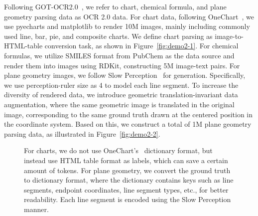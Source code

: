 \documentclass[11pt, a4paper, logo, copyright, nonumbering]{deepseek}
\begin{document}
\begin{CJK*}{UTF8}{gbsn}
Following GOT-OCR2.0~\cite{wei2024general}, we refer to chart, chemical formula, and plane geometry parsing data as OCR 2.0 data. For chart data, following OneChart~\cite{chen2024onechart}, we use pyecharts and matplotlib to render 10M images, mainly including commonly used line, bar, pie, and composite charts. We define chart parsing as image-to-HTML-table conversion task, as shown in Figure~\ref{fig:demo2-1}. For chemical formulas, we utilize SMILES format from PubChem as the data source and render them into images using RDKit, constructing 5M image-text pairs. For plane geometry images, we follow Slow Perception~\cite{wei2024slow} for generation. Specifically, we use perception-ruler size as 4 to model each line segment. To increase the diversity of rendered data, we introduce geometric translation-invariant data augmentation, where the same geometric image is translated in the original image, corresponding to the same ground truth drawn at the centered position in the coordinate system. Based on this, we construct a total of 1M plane geometry parsing data, as illustrated in Figure~\ref{fig:demo2-2}. 


\begin{figure}[!t]
    \centering
    \caption{For charts, we do not use OneChart's~\cite{chen2024onechart} dictionary format, but instead use HTML table format as labels, which can save a certain amount of tokens. For plane geometry, we convert the ground truth to dictionary format, where the dictionary contains keys such as line segments, endpoint coordinates, line segment types, etc., for better readability. Each line segment is encoded using the Slow Perception~\cite{wei2024slow} manner.}
    \label{fig:demo2}
\end{figure}



\end{CJK*}
\end{document}
